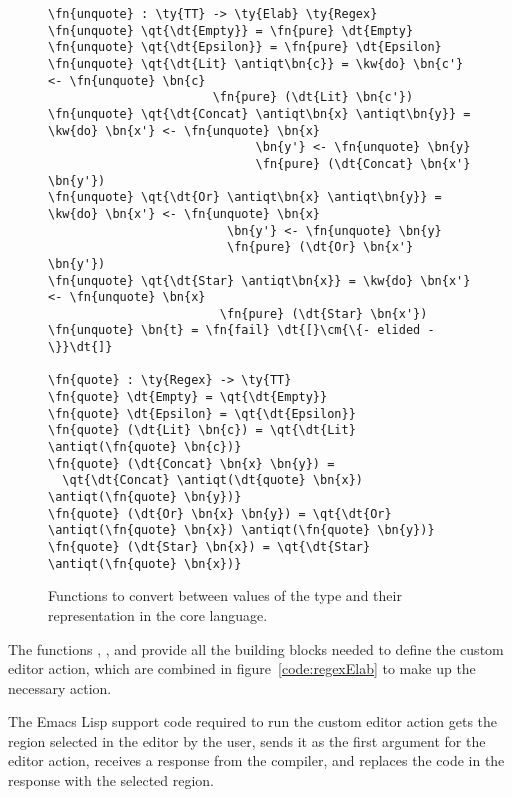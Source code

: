 \begin{figure}[ht]
\begin{Verbatim}
\fn{unquote} : \ty{TT} -> \ty{Elab} \ty{Regex}
\fn{unquote} \qt{\dt{Empty}} = \fn{pure} \dt{Empty}
\fn{unquote} \qt{\dt{Epsilon}} = \fn{pure} \dt{Epsilon}
\fn{unquote} \qt{\dt{Lit} \antiqt\bn{c}} = \kw{do} \bn{c'} <- \fn{unquote} \bn{c}
                       \fn{pure} (\dt{Lit} \bn{c'})
\fn{unquote} \qt{\dt{Concat} \antiqt\bn{x} \antiqt\bn{y}} = \kw{do} \bn{x'} <- \fn{unquote} \bn{x}
                             \bn{y'} <- \fn{unquote} \bn{y}
                             \fn{pure} (\dt{Concat} \bn{x'} \bn{y'})
\fn{unquote} \qt{\dt{Or} \antiqt\bn{x} \antiqt\bn{y}} = \kw{do} \bn{x'} <- \fn{unquote} \bn{x}
                         \bn{y'} <- \fn{unquote} \bn{y}
                         \fn{pure} (\dt{Or} \bn{x'} \bn{y'})
\fn{unquote} \qt{\dt{Star} \antiqt\bn{x}} = \kw{do} \bn{x'} <- \fn{unquote} \bn{x}
                        \fn{pure} (\dt{Star} \bn{x'})
\fn{unquote} \bn{t} = \fn{fail} \dt{[}\cm{\{- elided -\}}\dt{]}

\fn{quote} : \ty{Regex} -> \ty{TT}
\fn{quote} \dt{Empty} = \qt{\dt{Empty}}
\fn{quote} \dt{Epsilon} = \qt{\dt{Epsilon}}
\fn{quote} (\dt{Lit} \bn{c}) = \qt{\dt{Lit} \antiqt(\fn{quote} \bn{c})}
\fn{quote} (\dt{Concat} \bn{x} \bn{y}) =
  \qt{\dt{Concat} \antiqt(\dt{quote} \bn{x}) \antiqt(\fn{quote} \bn{y})}
\fn{quote} (\dt{Or} \bn{x} \bn{y}) = \qt{\dt{Or} \antiqt(\fn{quote} \bn{x}) \antiqt(\fn{quote} \bn{y})}
\fn{quote} (\dt{Star} \bn{x}) = \qt{\dt{Star} \antiqt(\fn{quote} \bn{x})}
\end{Verbatim}
\caption{Functions to convert between values of the  type and their representation in the core language.}
\label{code:regexQuote}
\end{figure}

The functions , , and  provide all the
building blocks needed to define the custom editor action, which are combined in
figure~\ref{code:regexElab} to make up the necessary \Elab{} action.

The Emacs Lisp support code required to run the custom editor action gets the
region selected in the editor by the user, sends it as the first argument for
the  editor action, receives a response from the compiler,
and replaces the code in the response with the selected region.

